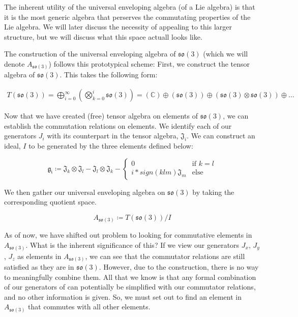 \documentclass[10pt]{ucthesis}
\newcommand{\C}{\mathbb{C}}
\begin{document}
The inherent utility of the universal enveloping algebra (of a Lie algebra) is that it is the most generic algebra that perserves the commutating properties of the Lie algebra. We will later discuss the necessity of appealing to this larger structure, but we will discuss what this space actuall looks like. 

The construction of the universal enveloping algebra of $\mathfrak{so(3)}$ (which we will denote $A_{\mathfrak{so(3)}}$) follows this prototypical scheme: First, we construct the tensor algebra of $\mathfrak{so(3)}$. This takes the following form:

\begin{equation}
	\begin{aligned}
		T(\mathfrak{so(3)}) = \bigoplus_{i=0}^\infty \left(\bigotimes_{k=0}^i \mathfrak{so(3)}\right) = \left(\C\right) \oplus \left(\mathfrak{so(3)}\right) \oplus \left(\mathfrak{so(3)}\otimes \mathfrak{so(3)}\right) \oplus \hdots
	\end{aligned}
\end{equation} 

Now that we have created (free) tensor algebra on elements of $\mathfrak{so(3)}$, we can establish the commutation relations on elements. We identify each of our generators $J_i$ with its counterpart in the tensor algebra, $\mathfrak{J}_i$. We can construct an ideal, $I$ to be generated by the three elements defined below: 

$$\mathfrak{g_i} \coloneq \mathfrak{J}_k \otimes \mathfrak{J}_l - \mathfrak{J}_l\otimes \mathfrak{J}_k - \begin{cases}
	0 & \text{if }k=l	\\
	i*sign(klm) \mathfrak{J}_m &\text{else}
\end{cases}$$

We then gather our universal enveloping algebra on $\mathfrak{so(3)}$ by taking the corresponding quotient space.

$$A_{\mathfrak{so(3)}} \coloneq T(\mathfrak{so(3)}) / I$$

As of now, we have shifted out problem to looking for commutative elements in $A_{\mathfrak{so(3)}}$. What is the inherent significance of this? If we view our generators $J_x$, $J_y$, $J_z$ as elements in $A_{\mathfrak{so(3)}}$, we can see that the commutator relations are still satisfied as they are in $\mathfrak{so(3)}$. However, due to the construction, there is no way to meaningfully combine them. All that we know is that any formal combination of our generators of can potentially be simplified with our commutator relations, and no other information is given. So, we must set out to find an element in $A_{\mathfrak{so(3)}}$ that commutes with all other elements.
\end{document}
